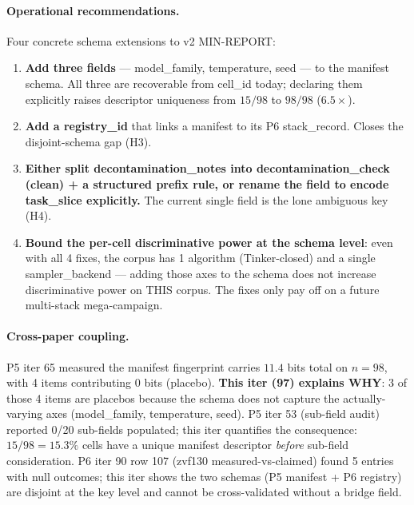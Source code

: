 \paragraph{Operational recommendations.}
Four concrete schema extensions to v2 MIN-REPORT:
\begin{enumerate}
\item \textbf{Add three fields} --- \textsf{model\_family},
\textsf{temperature}, \textsf{seed} --- to the manifest schema.
All three are recoverable from cell\_id today; declaring them
explicitly raises descriptor uniqueness from $15/98$ to $98/98$
($6.5\times$).
\item \textbf{Add a \textsf{registry\_id}} that links a manifest
to its P6 stack\_record. Closes the disjoint-schema gap (H3).
\item \textbf{Either split \textsf{decontamination\_notes} into
\textsf{decontamination\_check} (clean) + a structured prefix rule,
or rename the field to encode \textsf{task\_slice} explicitly.}
The current single field is the lone ambiguous key (H4).
\item \textbf{Bound the per-cell discriminative power at the schema
level}: even with all 4 fixes, the corpus has 1 algorithm
(Tinker-closed) and a single sampler\_backend --- adding those axes
to the schema does not increase discriminative power on THIS
corpus. The fixes only pay off on a future multi-stack
mega-campaign.
\end{enumerate}

\paragraph{Cross-paper coupling.}
P5 iter 65 measured the manifest fingerprint carries $11.4$ bits
total on $n{=}98$, with 4 items contributing 0 bits (placebo).
\textbf{This iter (97) explains WHY}: 3 of those 4 items are
placebos because the schema does not capture the actually-varying
axes (\textsf{model\_family, temperature, seed}). P5 iter 53
(sub-field audit) reported 0/20 sub-fields populated; this iter
quantifies the consequence: $15/98 = 15.3\%$ cells have a unique
manifest descriptor \emph{before} sub-field consideration. P6 iter
90 row 107 (zvf130 measured-vs-claimed) found 5 entries with null
outcomes; this iter shows the two schemas (P5 manifest + P6
registry) are disjoint at the key level and cannot be
cross-validated without a bridge field.